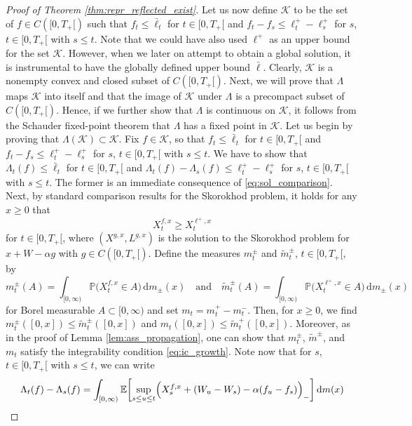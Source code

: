 \documentclass[11pt, a4paper]{article}
\theoremstyle{plain}
\theoremstyle{definition}
\theoremstyle{remark}
\numberwithin{equation}{section}
\newcommand{\ev}{\mathbb{E}}
\newcommand{\pr}{\mathbb{P}}
\renewcommand{\d}{\mathrm{d}}
\renewcommand{\cal}[1]{\mathcal{#1}}
\begin{document}
\begin{proof}[Proof of Theorem \ref{thm:repr_reflected_exist}]
Let us now define $\cal{K}$ to be the set of $f \in C([0, T_+[)$ such that $f_t \leq \bar{\ell}_t$ for $t \in [0, T_+[$ and $f_t - f_s \leq \ell^+_t - \ell^+_s$ for $s$, $t \in [0, T_+[$ with $s \leq t$. Note that we could have also used $\ell^+$ as an upper bound for the set $\cal{K}$. However, when we later on attempt to obtain a global solution, it is instrumental to have the globally defined upper bound $\bar{\ell}$. Clearly, $\cal{K}$ is a nonempty convex and closed subset of $C([0, T_+[)$. Next, we will prove that $\Lambda$ maps $\cal{K}$ into itself and that the image of $\cal{K}$ under $\Lambda$ is a precompact subset of $C([0, T_+[)$. Hence, if we further show that $\Lambda$ is continuous on $\cal{K}$, it follows from the Schauder fixed-point theorem that $\Lambda$ has a fixed point in $\cal{K}$. Let us begin by proving that $\Lambda(\cal{K}) \subset \cal{K}$. Fix $f \in \cal{K}$, so that $f_t \leq \bar{\ell}_t$ for $t \in [0, T_+[$ and $f_t - f_s \leq \ell^+_t - \ell^+_s$ for $s$, $t \in [0, T_+[$ with $s \leq t$. We have to show that $\Lambda_t(f) \leq \bar{\ell}_t$ for $t \in [0, T_+[$ and $\Lambda_t(f) - \Lambda_s(f) \leq \ell^+_t - \ell^+_s$ for $s$, $t \in [0, T_+[$ with $s \leq t$. The former is an immediate consequence of \eqref{eq:sol_comparison}. Next, by standard comparison results for the Skorokhod problem, it holds for any $x \geq 0$ that
\begin{equation*}
    X^{f, x}_t \geq X^{\ell^+, x}_t
\end{equation*}
for $t \in [0, T_+[$, where $(X^{g, x}, L^{g, x})$ is the solution to the Skorokhod problem for $x + W - \alpha g$ with $g \in C([0, T_+[)$. Define the measures $m^{\pm}_t$ and $\tilde{m}^{\pm}_t$, $t \in [0, T_+[$, by
\begin{equation*}
    m^{\pm}_t(A) = \int_{[0, \infty)} \pr\bigl(X^{f, x}_t \in A\bigr) \, \d m_{\pm}(x) \quad \text{and} \quad \tilde{m}^{\pm}_t(A) = \int_{[0, \infty)} \pr\bigl(X^{\ell^+, x}_t \in A\bigr) \, \d m_{\pm}(x)
\end{equation*}
for Borel measurable $A \subset [0, \infty)$ and set $m_t = m^+_t - m^-_t$. Then, for $x \geq 0$, we find $m^{\pm}_t([0, x]) \leq \tilde{m}^{\pm}_t([0, x])$ and $m_t([0, x]) \leq \tilde{m}^+_t([0, x])$. Moreover, as in the proof of Lemma \ref{lem:ass_propagation}, one can show that $m^{\pm}_t$, $\tilde{m}^{\pm}$, and $m_t$ satisfy the integrability condition \eqref{eq:ic_growth}. Note now that for $s$, $t \in [0, T_+[$ with $s \leq t$, we can write
\begin{align*}
    \Lambda_t(f) - \Lambda_s(f) &= \int_{[0, \infty)} \ev\biggl[\sup_{s \leq u \leq t} \Bigl(X^{f, x}_s + (W_u - W_s) - \alpha (f_u - f_s)\Bigr)_-\biggr] \, \d m(x) \\

\end{align*}
\end{proof}
\end{document}

